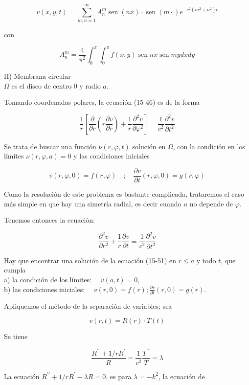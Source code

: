 \documentclass[10pt]{article}
\theoremstyle{plain}
\theoremstyle{definition}
\theoremstyle{remark}
\begin{document}
$$
v(x, y, t)=\sum_{m, n=1}^{\infty} A_{n}^{m} \operatorname{sen}(n x) \cdot \operatorname{sen}(m \cdot) e^{-c^{2}\left(m^{2}+n^{2}\right) t}
$$

con

$$
A_{n}^{m}=\frac{4}{\pi^{2}} \int_{0}^{\pi} \int_{0}^{\pi} f(x, y) \operatorname{sen} n x \operatorname{sen} m y d x d y
$$

II) Membrana circular\\
$\Omega$ es el disco de centro 0 y radio $a$.

Tomando coordenadas polares, la ecuación (15-46) es de la forma

$$
\frac{1}{r}\left[\frac{\partial}{\partial r}\left(r \frac{\partial v}{\partial r}\right)+\frac{1}{r} \frac{\partial^{2} v}{\partial \varphi^{2}}\right]=\frac{1}{c^{2}} \frac{\partial^{2} v}{\partial t^{2}}
$$

Se trata de buscar una función $\nu(r, \varphi, t)$ solución en $\Omega$, con la condición en los límites $\nu(r, \varphi, a)=0$ y las condiciones iniciales

$$
v(r, \varphi, 0)=f(r, \varphi) \quad ; \quad \frac{\partial v}{\partial t}(r, \varphi, 0)=g(r, \varphi)
$$

Como la resolución de este problema es bastante complicada, trataremos el caso más simple en que hay una simetría radial, es decir cuando $u$ no depende de $\varphi$.

Tenemos entonces la ecuación:


\begin{equation*}
\frac{\partial^{2} v}{\partial r^{2}}+\frac{1}{r} \frac{\partial v}{\partial t}=\frac{1}{c^{2}} \frac{\partial^{2} v}{\partial t^{2}} \tag{15-51}
\end{equation*}


Hay que encontrar una solución de la ecuación (15-51) en $r \leqslant a$ y todo $t$, que cumpla\\
a) la condición de los límites: $\quad v(a, t)=0$,\\
b) las condiciones iniciales: $\quad v(r, 0)=f(r) ; \frac{\partial v}{\partial t}(r, 0)=g(r)$.

Apliquemos el método de la separación de variables; sea

$$
v(r, t)=R(r) \cdot T(t)
$$

Se tiene

$$
\frac{R^{\prime \prime}+1 / r R^{\prime}}{R}=\frac{1}{c^{2}} \frac{T^{\prime \prime}}{T}=\lambda
$$

La ecuación $R^{\prime \prime}+1 / r R^{\prime}-\lambda R=0$, es para $\lambda=-k^{2}$, la ecuación de
\end{document}
